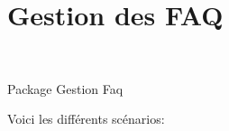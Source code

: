 \section{Gestion des FAQ}

\begin{center}
\\
\par{Package Gestion Faq}
\end{center}
Voici les diff{\'e}rents sc{\'e}narios:\\


